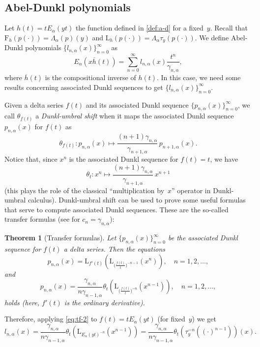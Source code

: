 \documentclass[11pt]{article}
\theoremstyle{plain}
\newtheorem{theorem}{Theorem}[section]
\theoremstyle{remark}
\numberwithin{equation}{section} %
\newcommand{\Ea}{E_{\alpha}}
\newcommand{\La}{\Lambda_{\alpha}}
\newcommand{\FF}{\mathrm{F}}
\newcommand{\LL}{\mathrm{L}}
\begin{document}
\subsection{Abel-Dunkl polynomials}

Let $h(t) = t\Ea(yt)$ the function defined in \eqref{def:a-d} for a fixed~$y$. Recall that $\FF_h(p(\cdot)) = \La(p)(y)$ and $\LL_h(p(\cdot)) = \La \tau_y (p(\cdot))$. We define Abel-Dunkl polynomials $\{l_{n,\alpha}(x)\}_{n=0}^\infty$ as
\[
\Ea(x\overline{h}(t)) = \sum_{n=0}^{\infty} {l_{n,\alpha}(x)} \frac{t^n}{\gamma_{n,\alpha}},
\]
where $\overline{h}(t)$ is the compositional inverse of $h(t)$. In this case, we need some results concerning associated Dunkl sequences to get $\{l_{n,\alpha}(x)\}_{n=0}^\infty$.

Given a delta series $f(t)$ and its associated Dunkl sequence $\{p_{n,\alpha}(x)\}_{n=0}^\infty$, we call $\theta_{f(t)}$ a \textit{Dunkl-umbral shift} when it maps the associated Dunkl sequence $p_{n,\alpha}(x)$ for $f(t)$ as
\[
\theta_{f(t)}:p_{n,\alpha}(x) \mapsto \frac{(n+1)\gamma_{n,\alpha}}{\gamma_{n+1,\alpha}} \,p_{n+1,\alpha}(x).
\]
Notice that, since $x^n$ is the associated Dunkl sequence for $f(t) = t$, we have
\[
\theta_{t}:x^n \mapsto \frac{(n+1)\gamma_{n,\alpha}}{\gamma_{n+1,\alpha}} \,x^{n+1}
\]
(this plays the role of the classical ``multiplication by~$x$'' operator in Dunkl-umbral calculus). Dunkl-umbral shift can be used to prove some useful formulas that serve to compute associated Dunkl sequences. These are the so-called transfer formulas (see \cite[Theorem 6.2.10]{Rom} for $c_n = \gamma_{n,\alpha}$):

\begin{theorem}[Transfer formulas]
Let $\{p_{n,\alpha}(x)\}_{n=0}^\infty$ be the associated Dunkl sequence for $f(t)$ a delta series. Then the equations
\begin{equation*}
p_{n,\alpha}(x) = \LL_{f'(t)}\left(\LL_{\big(\frac{f(t)}{t}\big)^{-n-1}}(x^{n})\right), \quad n=1,2,\dots,
\end{equation*}
and
\begin{equation}
\label{eq:tf-2}
p_{n,\alpha}(x) = \frac{\gamma_{n,\alpha}}{n\gamma_{n-1,\alpha}}
\theta_t\left(\LL_{\big(\frac{f(t)}{t}\big)^{-n}}(x^{n-1})\right), \quad n=1,2,\dots,
\end{equation}
holds (here, $f'(t)$ is the ordinary derivative).
\end{theorem}

Therefore, applying \eqref{eq:tf-2} to $f(t) = t\Ea(yt)$ (for fixed~$y$) we get
\begin{equation*}
l_{n,\alpha}(x)  = \frac{\gamma_{n,\alpha}}{n\gamma_{n-1,\alpha}} \theta_t(\LL_{\Ea(yt)^{-n}}(x^{n-1})) 
= \frac{\gamma_{n,\alpha}}{n\gamma_{n-1,\alpha}} \theta_t(\tau_y^{-n}((\cdot)^{n-1}))(x).
\end{equation*}
\end{document}
